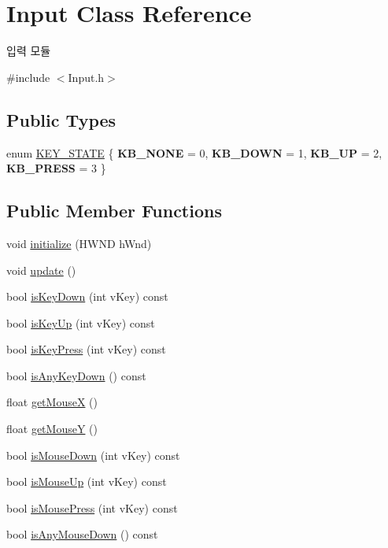 \hypertarget{class_input}{}\section{Input Class Reference}
\label{class_input}


입력 모듈  




{\ttfamily \#include $<$Input.\+h$>$}

\subsection*{Public Types}
\begin{DoxyCompactItemize}
\item 
enum \mbox{\hyperlink{class_input_a3ad94f6f60870f7464dba31684faf705}{K\+E\+Y\+\_\+\+S\+T\+A\+TE}} \{ {\bfseries K\+B\+\_\+\+N\+O\+NE} = 0, 
{\bfseries K\+B\+\_\+\+D\+O\+WN} = 1, 
{\bfseries K\+B\+\_\+\+UP} = 2, 
{\bfseries K\+B\+\_\+\+P\+R\+E\+SS} = 3
 \}
\end{DoxyCompactItemize}
\subsection*{Public Member Functions}
\begin{DoxyCompactItemize}
\item 
void \mbox{\hyperlink{class_input_a6a6b22db894128d4bb3c4b15066e6ad6}{initialize}} (H\+W\+ND h\+Wnd)
\item 
void \mbox{\hyperlink{class_input_aa7fe26710dd863d11737bf2f6de4ad05}{update}} ()
\item 
bool \mbox{\hyperlink{class_input_ad1f7bdecf93d675bab7469779719d4a5}{is\+Key\+Down}} (int v\+Key) const
\item 
bool \mbox{\hyperlink{class_input_a7d505c2a0e149215daa3224b10b826b8}{is\+Key\+Up}} (int v\+Key) const
\item 
bool \mbox{\hyperlink{class_input_a0ceb59370dc3a794ff26c2c5652fee97}{is\+Key\+Press}} (int v\+Key) const
\item 
bool \mbox{\hyperlink{class_input_a99501c309c9c78ed1db9a63fdf53110e}{is\+Any\+Key\+Down}} () const
\item 
float \mbox{\hyperlink{class_input_aad68569383410edc8f78a943113ce511}{get\+MouseX}} ()
\item 
float \mbox{\hyperlink{class_input_ab8cd307e1a0fe647309da8583a51807b}{get\+MouseY}} ()
\item 
bool \mbox{\hyperlink{class_input_ade50a28d9020824e82e20539b6d3a191}{is\+Mouse\+Down}} (int v\+Key) const
\item 
bool \mbox{\hyperlink{class_input_aed53e73611a1a265ece72b8b90479659}{is\+Mouse\+Up}} (int v\+Key) const
\item 
bool \mbox{\hyperlink{class_input_ad066252083b8374a5fa9b583c4f02593}{is\+Mouse\+Press}} (int v\+Key) const
\item 
bool \mbox{\hyperlink{class_input_af9f8f40d0a19843f11e9a9a201b6a806}{is\+Any\+Mouse\+Down}} () const
\end{DoxyCompactItemize}
